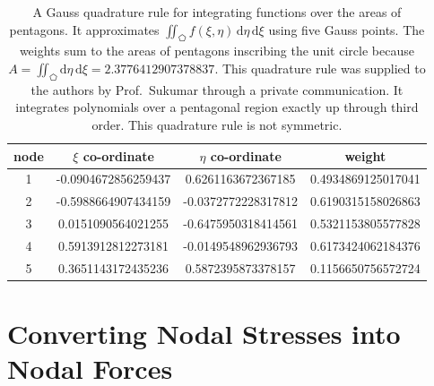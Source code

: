 \begin{table}
    \begin{center}
        \begin{tabular}{|c|ccc|}
            \hline
            node & $\xi$ co-ordinate & $\eta$ co-ordinate  & weight \\ \hline 
            1 & -0.0904672856259437 &  \phantom{-}0.6261163672367185 &
             0.4934869125017041 \\ 
            2 & -0.5988664907434159 & -0.0372772228317812 & 
             0.6190315158026863 \\ 
            3 & \phantom{-}0.0151090564021255 & -0.6475950318414561 &
             0.5321153805577828 \\ 
            4 & \phantom{-}0.5913912812273181 & -0.0149548962936793 &
             0.6173424062184376 \\
            5 & \phantom{-}0.3651143172435236 &  \phantom{-}0.5872395873378157 &
             0.1156650756572724 \\ 
            \hline
        \end{tabular}
    \end{center}
    \caption{A Gauss quadrature rule for integrating functions over the areas of pentagons.  It approximates $\iint_{\pentagon} f (\xi, \eta) \, \mathrm{d} \eta \, \mathrm{d} \xi$ using five Gauss points.  The weights sum to the areas of pentagons inscribing the unit circle because $A = \iint_{\pentagon} \mathrm{d} \eta \, \mathrm{d} \xi = 2.3776412907378837$. This quadrature rule was supplied to the authors by Prof.\ Sukumar through a private communication.  It integrates polynomials over a pentagonal region exactly up through third order.  This quadrature rule is not symmetric.}
    \label{tab:5nodePentagon}
\end{table}

\section{Converting Nodal Stresses into Nodal Forces}


